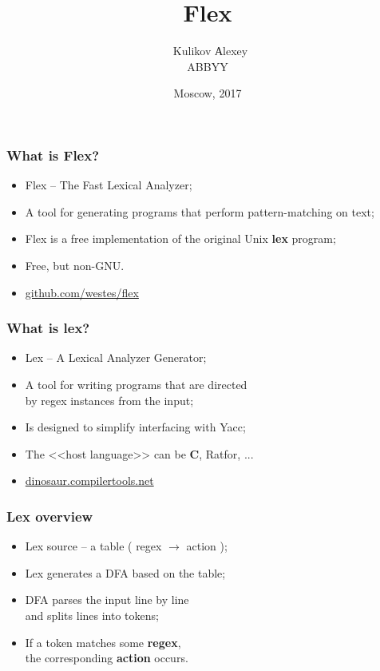 \documentclass[14pt]{beamer}
\title{Flex}
\subtitle{\footnotesize{}}
\author{\small{%
		~Kulikov Аlexey}\\%
	\vspace{30pt}%
	ABBYY%
	\vspace{20pt}%
}
\date{\small{Moscow, 2017}}
\begin{document}
	
	\maketitle
	
	\begin{frame}
		
		\frametitle{What is Flex?}
		\begin{itemize}
			\item Flex -- The Fast Lexical Analyzer;
			\item A tool for generating programs that perform pattern-matching on text;
			\item Flex is a free implementation of the original Unix \textbf{lex} program;
			\item Free, but non-GNU.
			\item \href{https://github.com/westes/flex}{github.com/westes/flex}
		\end{itemize}
	\end{frame}

	\begin{frame}
	
		\frametitle{What is lex?}
		\begin{itemize}
			\item Lex -- A Lexical Analyzer Generator;
			\item A tool for writing programs that are directed \\by regex instances from the input;
			\item Is designed to simplify interfacing with Yacc;
			\item The <<host language>> can be \textbf{C}, Ratfor, ...
			\item \href{http://dinosaur.compilertools.net/}{dinosaur.compilertools.net}
		\end{itemize}
	\end{frame}
		
	\begin{frame}
	
		\frametitle{Lex overview}
		\begin{itemize}
			\item Lex source -- a table ( regex $\rightarrow$ action );
			\item Lex generates a DFA based on the table;
			\item DFA parses the input line by line \\and splits lines into tokens;
			\item If a token matches some \textbf{regex}, \\the corresponding \textbf{action} occurs.
		\end{itemize}
	\end{frame}	
\end{document}

